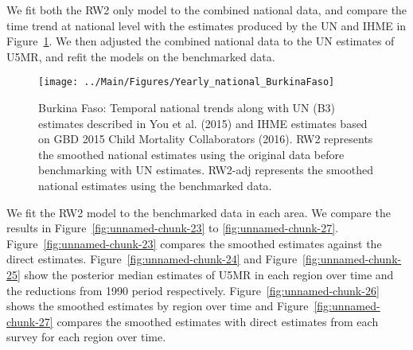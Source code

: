 \documentclass[12pt]{article}\usepackage[]{graphicx}\usepackage[]{color}
\newenvironment{knitrout}{}{} %
\begin{document}
We fit both the RW2 only model to the combined national data, and compare the time trend at national level with the estimates produced by the UN and IHME in Figure~\ref{fig:unnamed-chunk-22}. We then adjusted the combined national data to the UN estimates of U5MR, and refit the models on the benchmarked data. 

\begin{knitrout}
\color{fgcolor}\begin{figure}[bht]

{\centering \texttt{[image: ../Main/Figures/Yearly\_national\_BurkinaFaso]} 

}

\caption[Burkina Faso]{Burkina Faso: Temporal national trends along with UN (B3) estimates described in You et al. (2015) and IHME estimates based on GBD 2015 Child Mortality Collaborators (2016). RW2 represents the smoothed national estimates using the original data before benchmarking with UN estimates. RW2-adj represents the smoothed national estimates using the benchmarked data.}\label{fig:unnamed-chunk-22}
\end{figure}


\end{knitrout}
 

We fit the RW2 model to the benchmarked data in each area. 
We compare the results in Figure~\ref{fig:unnamed-chunk-23} to \ref{fig:unnamed-chunk-27}.
Figure~\ref{fig:unnamed-chunk-23} compares the smoothed estimates against the direct estimates. Figure~\ref{fig:unnamed-chunk-24} and Figure~\ref{fig:unnamed-chunk-25} show the posterior median estimates of U5MR in each region over time and the reductions from 1990 period respectively.
Figure~\ref{fig:unnamed-chunk-26} shows the smoothed estimates by region over time and Figure~\ref{fig:unnamed-chunk-27} compares the smoothed estimates with direct estimates from each survey for each region over time.




\end{document}
